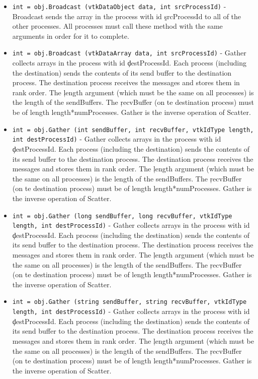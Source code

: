 \begin{itemize}
\item  \verb|int = obj.Broadcast (vtkDataObject data, int srcProcessId)| -  Broadcast sends the array in the process with id \c srcProcessId to all of
 the other processes.  All processes must call these method with the same
 arguments in order for it to complete.

\item  \verb|int = obj.Broadcast (vtkDataArray data, int srcProcessId)| -  Gather collects arrays in the process with id \c destProcessId.  Each
 process (including the destination) sends the contents of its send buffer
 to the destination process.  The destination process receives the
 messages and stores them in rank order.  The \c length argument
 (which must be the same on all processes) is the length of the
 sendBuffers.  The \c recvBuffer (on te destination process) must be of
 length length*numProcesses.  Gather is the inverse operation of Scatter.

\item  \verb|int = obj.Gather (int sendBuffer, int recvBuffer, vtkIdType length, int destProcessId)| -  Gather collects arrays in the process with id \c destProcessId.  Each
 process (including the destination) sends the contents of its send buffer
 to the destination process.  The destination process receives the
 messages and stores them in rank order.  The \c length argument
 (which must be the same on all processes) is the length of the
 sendBuffers.  The \c recvBuffer (on te destination process) must be of
 length length*numProcesses.  Gather is the inverse operation of Scatter.

\item  \verb|int = obj.Gather (long sendBuffer, long recvBuffer, vtkIdType length, int destProcessId)| -  Gather collects arrays in the process with id \c destProcessId.  Each
 process (including the destination) sends the contents of its send buffer
 to the destination process.  The destination process receives the
 messages and stores them in rank order.  The \c length argument
 (which must be the same on all processes) is the length of the
 sendBuffers.  The \c recvBuffer (on te destination process) must be of
 length length*numProcesses.  Gather is the inverse operation of Scatter.

\item  \verb|int = obj.Gather (string sendBuffer, string recvBuffer, vtkIdType length, int destProcessId)| -  Gather collects arrays in the process with id \c destProcessId.  Each
 process (including the destination) sends the contents of its send buffer
 to the destination process.  The destination process receives the
 messages and stores them in rank order.  The \c length argument
 (which must be the same on all processes) is the length of the
 sendBuffers.  The \c recvBuffer (on te destination process) must be of
 length length*numProcesses.  Gather is the inverse operation of Scatter.


\end{itemize}
